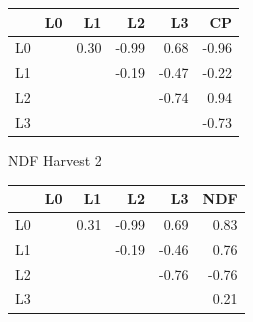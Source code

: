 \documentclass[12pt, letterpaper]{article}
\begin{document}
\begin{table}[h]
\begin{minipage}[h]{.45\textwidth}
\medskip

\begin{tabular}{rrrrrr}
 & L0 & L1 & L2 & L3 & CP \\ 
  \hline
L0 &  & 0.30 & -0.99 & 0.68 & -0.96 \\ 
  L1 & & & -0.19 & -0.47 & -0.22 \\ 
  L2 & & & & -0.74 & 0.94 \\ 
  L3 & & & & & -0.73 \\ 
   \hline
\end{tabular}
\bigskip
\bigskip

NDF Harvest 2

\medskip
\begin{tabular}{rrrrrr}
  \hline
 & L0 & L1 & L2 & L3 & NDF \\ 
  \hline
  L0 & & 0.31 & -0.99 & 0.69 & 0.83 \\ 
  L1 & & & -0.19 & -0.46 & 0.76 \\ 
  L2 & & & & -0.76 & -0.76 \\ 
  L3 & & & & & 0.21 \\ 
   \hline
\end{tabular}

\end{minipage}%
\label{curveParamCor}
\end{table}
\end{document}

